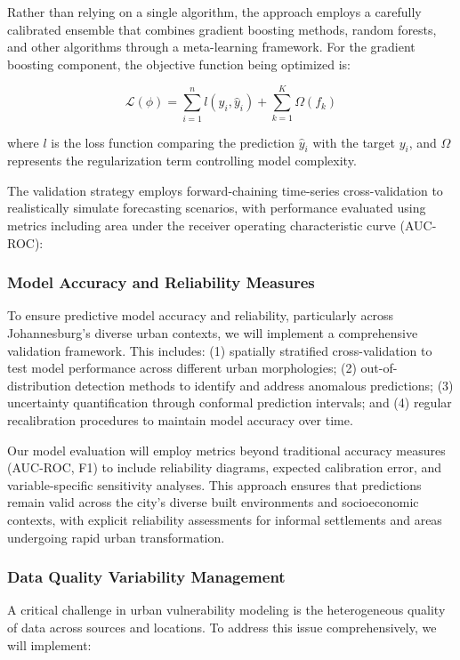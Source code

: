 Rather than relying on a single algorithm, the approach employs a carefully calibrated ensemble that combines gradient boosting methods, random forests, and other algorithms through a meta-learning framework. For the gradient boosting component, the objective function being optimized is:

\begin{equation}
\mathcal{L}(\phi) = \sum^n_{i=1} l(y_i, \hat{y}_i) + \sum^K_{k=1} \Omega(f_k)
\end{equation}

where $l$ is the loss function comparing the prediction $\hat{y}_i$ with the target $y_i$, and $\Omega$ represents the regularization term controlling model complexity.

The validation strategy employs forward-chaining time-series cross-validation to realistically simulate forecasting scenarios, with performance evaluated using metrics including area under the receiver operating characteristic curve (AUC-ROC):

\subsubsection{Model Accuracy and Reliability Measures}
To ensure predictive model accuracy and reliability, particularly across Johannesburg's diverse urban contexts, we will implement a comprehensive validation framework. This includes: (1) spatially stratified cross-validation to test model performance across different urban morphologies; (2) out-of-distribution detection methods to identify and address anomalous predictions; (3) uncertainty quantification through conformal prediction intervals; and (4) regular recalibration procedures to maintain model accuracy over time. 

Our model evaluation will employ metrics beyond traditional accuracy measures (AUC-ROC, F1) to include reliability diagrams, expected calibration error, and variable-specific sensitivity analyses. This approach ensures that predictions remain valid across the city's diverse built environments and socioeconomic contexts, with explicit reliability assessments for informal settlements and areas undergoing rapid urban transformation.

\subsubsection{Data Quality Variability Management}
A critical challenge in urban vulnerability modeling is the heterogeneous quality of data across sources and locations. To address this issue comprehensively, we will implement:

